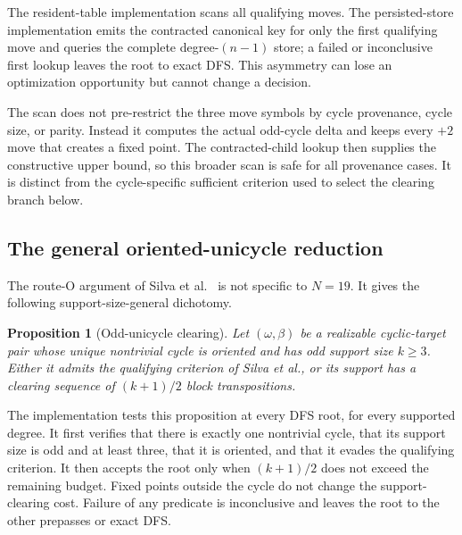\documentclass[11pt]{article}
\newtheorem{proposition}[theorem]{Proposition}
\theoremstyle{definition}
\theoremstyle{remark}
\begin{document}
The resident-table implementation scans all qualifying moves.  The
persisted-store implementation emits the contracted canonical key for only the
first qualifying move and queries the complete degree-$(n-1)$ store; a failed
or inconclusive first lookup leaves the root to exact DFS.  This asymmetry can
lose an optimization opportunity but cannot change a decision.

The scan does not pre-restrict the three move symbols by cycle provenance,
cycle size, or parity.  Instead it computes the actual odd-cycle delta and
keeps every $+2$ move that creates a fixed point.  The contracted-child lookup
then supplies the constructive upper bound, so this broader scan is safe for
all provenance cases.  It is distinct from the cycle-specific sufficient
criterion used to select the clearing branch below.

\subsection{The general oriented-unicycle reduction}

The route-O argument of Silva et
al.~\cite[Proposition~7.4]{SilvaEtAl2026} is not specific to $N=19$.
It gives the following support-size-general dichotomy.

\begin{proposition}[Odd-unicycle clearing]
\label{prop:odd-unicycle-clearing}
Let $(\omega,\beta)$ be a realizable cyclic-target pair whose unique
nontrivial cycle is oriented and has odd support size $k\geq3$.  Either it
admits the qualifying criterion of Silva et al., or its support has a clearing
sequence of $(k+1)/2$ block transpositions.
\end{proposition}

The implementation tests this proposition at every DFS root, for every
supported degree.  It first verifies that there is exactly one nontrivial
cycle, that its support size is odd and at least three, that it is oriented,
and that it evades the qualifying criterion.  It then accepts the root only
when $(k+1)/2$ does not exceed the remaining budget.  Fixed points outside the
cycle do not change the support-clearing cost.  Failure of any predicate is
inconclusive and leaves the root to the other prepasses or exact DFS.
\end{document}
